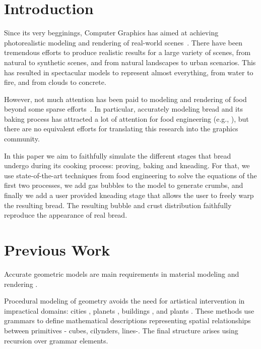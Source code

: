 \documentclass[final,5p,times]{elsarticle}
\begin{document}
\section{Introduction}
Since its very begginings, Computer Graphics has aimed at achieving photorealistic modeling and rendering of real-world scenes~\cite{Hughes2013}. There have been tremendous efforts to produce realistic results for a large variety of scenes, from natural to synthetic scenes, and from natural landscapes to urban scenarios. This has resulted in spectacular models to represent almost everything, from water to fire, and from clouds to concrete.

However, not much attention has been paid to modeling and rendering of food beyond some sparse efforts~\cite{Tong2005,Cho2007}. In particular, accurately modeling bread and its baking process has attracted a lot of attention for food engineering (e.g., \cite{Purlis2010}), but there are no equivalent efforts for translating this research into the graphics community.

In this paper we aim to faithfully simulate the different stages that bread undergo during its cooking process: proving, baking and kneading. For that, we use state-of-the-art techniques from food engineering to solve the equations of the first two processes, we add gas bubbles to the model to generate crumbs, and finally we add a user provided kneading stage that allows the user to freely warp the resulting bread. The resulting bubble and crust distribution faithfully reproduce the appearance of real bread.

\section{Previous Work}
Accurate geometric models are main requirements in material modeling and rendering \cite{Dorsey2007}. 

Procedural modeling of geometry avoids the need for artistical intervention in impractical domains: cities \cite{Parish2001}, planets \cite{Ebert2002}, buildings \cite{Muller2006}, and plants \cite{Prusinkiewicz1990}. These methods use grammars to define mathematical descriptions representing spatial relationships between primitives - cubes, cilynders, lines-. The final structure arises using recursion over grammar elements.
\end{document}
